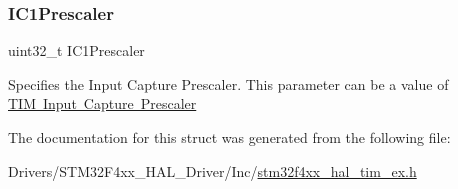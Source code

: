 \subsubsection{\texorpdfstring{I\+C1\+Prescaler}{IC1Prescaler}}
{\footnotesize\ttfamily uint32\+\_\+t I\+C1\+Prescaler}

Specifies the Input Capture Prescaler. This parameter can be a value of \mbox{\hyperlink{group___t_i_m___input___capture___prescaler}{T\+IM Input Capture Prescaler}} 

The documentation for this struct was generated from the following file\+:\begin{DoxyCompactItemize}
\item 
Drivers/\+S\+T\+M32\+F4xx\+\_\+\+H\+A\+L\+\_\+\+Driver/\+Inc/\mbox{\hyperlink{stm32f4xx__hal__tim__ex_8h}{stm32f4xx\+\_\+hal\+\_\+tim\+\_\+ex.\+h}}\end{DoxyCompactItemize}
